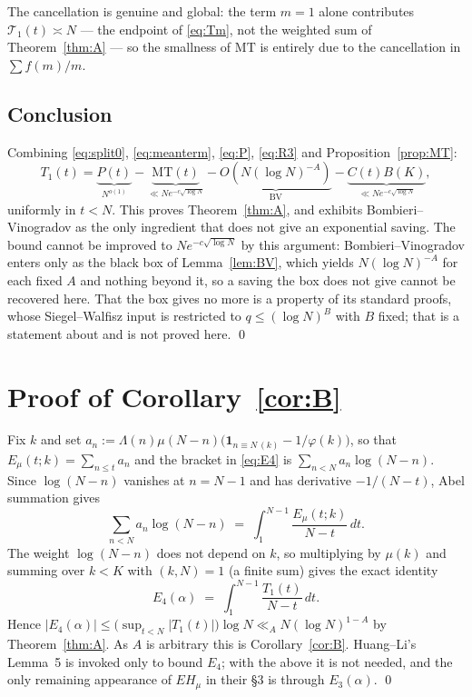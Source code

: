 \documentclass[11pt,a4paper]{article}
\theoremstyle{plain}
\theoremstyle{definition}
\theoremstyle{remark}
\newcommand{\Emu}{E_\mu}
\newcommand{\Tcut}{\mathcal T}
\begin{document}
The cancellation is genuine and global: the term $m=1$ alone
contributes $\Tcut_1(t)\asymp N$ --- the endpoint of \eqref{eq:Tm}, not
the weighted sum of Theorem~\ref{thm:A} --- so the smallness of
$\mathrm{MT}$ is
entirely due to the cancellation in $\sum f(m)/m$.

\subsection{Conclusion}

Combining \eqref{eq:split0}, \eqref{eq:meanterm}, \eqref{eq:P},
\eqref{eq:R3} and Proposition~\ref{prop:MT}:
\[
  T_1(t)=\underbrace{P(t)}_{N^{o(1)}}
         -\underbrace{\mathrm{MT}(t)}_{\ll Ne^{-c\sqrt{\log N}}}
         -\underbrace{O\!\left(N(\log N)^{-A}\right)}_{\text{BV}}
         -\underbrace{C(t)B(K)}_{\ll Ne^{-c\sqrt{\log N}}},
\]
uniformly in $t<N$. This proves Theorem~\ref{thm:A}, and exhibits
Bombieri--Vinogradov as the only ingredient that does not give an
exponential saving. The bound cannot be improved to
$Ne^{-c\sqrt{\log N}}$ by this argument: Bombieri--Vinogradov enters
only as the black box of Lemma~\ref{lem:BV}, which yields
$N(\log N)^{-A}$ for each fixed $A$ and nothing beyond it, so a saving
the box does not give cannot be recovered here. That the box gives no
more is a property of its standard proofs, whose Siegel--Walfisz input
is restricted to $q\le(\log N)^{B}$ with $B$ fixed; that is a
statement about \cite{MoV2} and is not proved here. \qed

\section{Proof of \texorpdfstring{Corollary~\ref{cor:B}}{the corollary}}

Fix $k$ and set
$a_n:=\Lambda(n)\mu(N-n)\bigl(\mathbf 1_{n\equiv N\,(k)}-1/\varphi(k)\bigr)$,
so that $\Emu(t;k)=\sum_{n\le t}a_n$ and the bracket in \eqref{eq:E4}
is $\sum_{n<N}a_n\log(N-n)$. Since $\log(N-n)$ vanishes at $n=N-1$ and
has derivative $-1/(N-t)$, Abel summation gives
\[
  \sum_{n<N}a_n\log(N-n)\;=\;\int_{1}^{N-1}\frac{\Emu(t;k)}{N-t}\,dt .
\]
The weight $\log(N-n)$ does not depend on $k$, so multiplying by
$\mu(k)$ and summing over $k<K$ with $(k,N)=1$ (a finite sum) gives
the exact identity
\[
  E_4(\alpha)\;=\;\int_{1}^{N-1}\frac{T_1(t)}{N-t}\,dt .
\]
Hence $|E_4(\alpha)|\le\bigl(\sup_{t<N}|T_1(t)|\bigr)\log N
\ll_A N(\log N)^{1-A}$ by Theorem~\ref{thm:A}. As $A$ is arbitrary
this is Corollary~\ref{cor:B}. Huang--Li's Lemma~5 is invoked only to
bound $E_4$; with the above it is not needed, and the only remaining
appearance of $EH_\mu$ in their \S3 is through $E_3(\alpha)$. \qed
\end{document}
